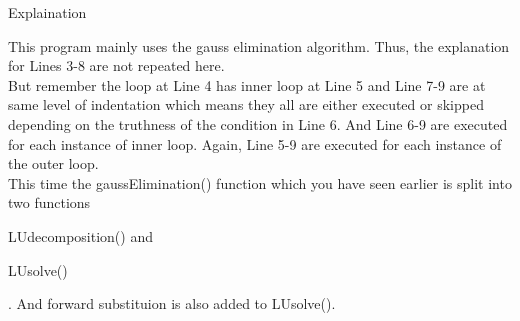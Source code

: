 \begin{remark}Explaination
\begin{commentary}
	This program mainly uses the gauss elimination algorithm. Thus, the explanation for Lines 3-8 are not repeated here.\\

	But remember the loop at Line 4 has inner loop at Line 5 and Line 7-9 are at same level of indentation which means they all are either executed or skipped depending on the truthness of the condition in Line 6. And Line 6-9 are executed for each instance of inner loop. Again, Line 5-9 are executed for each instance of the outer loop.\\

This time the gaussElimination() function which you have seen earlier is split into two functions \begin{enumerate*} \item LUdecomposition() and \item LUsolve() \end{enumerate*}. And forward substituion is also added to LUsolve().


\end{commentary}
\end{remark}
